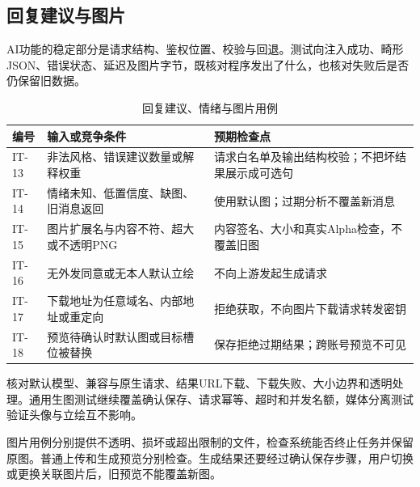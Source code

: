 \subsection*{回复建议与图片}
AI功能的稳定部分是请求结构、鉴权位置、校验与回退。测试向注入成功、畸形JSON、错误状态、延迟及图片字节，既核对程序发出了什么，也核对失败后是否仍保留旧数据。

\begin{table}[H]\centering\small
\caption{回复建议、情绪与图片用例}
\begin{tabularx}{\linewidth}{@{}p{15mm}p{38mm}X@{}}\toprule
编号 & 输入或竞争条件 & 预期检查点 \\ \midrule
IT-13 & 非法风格、错误建议数量或解释权重 & 请求白名单及输出结构校验；不把坏结果展示成可选句 \\
IT-14 & 情绪未知、低置信度、缺图、旧消息返回 & 使用默认图；过期分析不覆盖新消息 \\
IT-15 & 图片扩展名与内容不符、超大或不透明PNG & 内容签名、大小和真实Alpha检查，不覆盖旧图 \\
IT-16 & 无外发同意或无本人默认立绘 & 不向上游发起生成请求 \\
IT-17 & 下载地址为任意域名、内部地址或重定向 & 拒绝获取，不向图片下载请求转发密钥 \\
IT-18 & 预览待确认时默认图或目标槽位被替换 & 保存拒绝过期结果；跨账号预览不可见 \\ \bottomrule
\end{tabularx}\end{table}

核对默认模型、兼容与原生请求、结果URL下载、下载失败、大小边界和透明处理。通用生图测试继续覆盖确认保存、请求幂等、超时和并发名额，媒体分离测试验证头像与立绘互不影响。

图片用例分别提供不透明、损坏或超出限制的文件，检查系统能否终止任务并保留原图。普通上传和生成预览分别检查。生成结果还要经过确认保存步骤，用户切换或更换关联图片后，旧预览不能覆盖新图。
